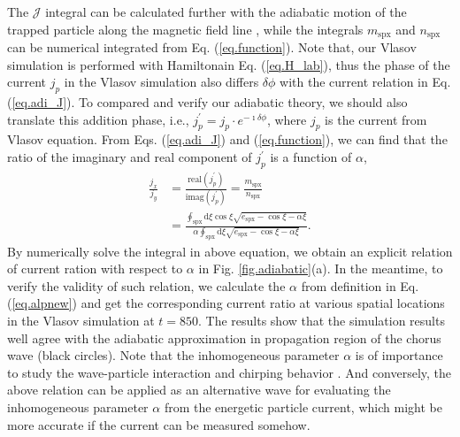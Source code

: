 The $\mathcal{J}$ integral can be calculated further with the adiabatic motion of the trapped particle along the magnetic field line \cite{summers2012}, while the integrals $m_\mathrm{spx}$ and $n_\mathrm{spx}$ can be numerical integrated from Eq. (\ref{eq.function}).
Note that, our Vlasov simulation is performed with Hamiltonain Eq. (\ref{eq.H_lab}), thus the phase of the current $j_p$ in the Vlasov simulation also differs $\delta \phi$ with the current relation in Eq. (\ref{eq.adi_J}).
To compared and verify our adiabatic theory, we should also translate this addition phase, i.e., $j^\prime_{p} = j_p \cdot e^{-\imath \delta \phi}$, where $j_p$ is the current from Vlasov equation. 
From Eqs. (\ref{eq.adi_J}) and (\ref{eq.function}), we can find that the ratio of the imaginary and real component of $j^\prime_{p}$ is a function of $\alpha$, 
\begin{equation}\label{eq.adia_relation}
    \begin{aligned}
\frac{j_x}{j_y} &= \frac{\mathrm{real}(j^\prime_p)}{\mathrm{imag}(j^\prime_p)} = \frac{m_\mathrm{spx}}{n_\mathrm{spx}}
\\
& = \frac{\oint_\mathrm{s p x} \mathrm{d} \xi \cos \xi \sqrt{e_\mathrm{s p x}-\cos \xi-\alpha \xi}}{\alpha \oint_\mathrm{s p x} \mathrm{d} \xi \sqrt{e_\mathrm{s p x}-\cos \xi-\alpha \xi}}.
            \end{aligned}
\end{equation}
By numerically solve the integral in above equation, we obtain an explicit relation of current ration with respect to $\alpha$ in Fig. \ref{fig.adiabatic}(a). 
In the meantime, to verify the validity of such relation, we calculate the $\alpha$ from definition in Eq. (\ref{eq.alpnew}) and get the corresponding current ratio at various spatial locations in the Vlasov simulation \cite{zheng2023b,zheng2024} at $t=850$.
The results show that the simulation results well agree with the adiabatic approximation in propagation region of the chorus wave (black circles).
Note that the inhomogeneous parameter $\alpha$ is of importance to study the wave-particle interaction and chirping behavior \cite{tao_theoretical_2020,omura2008}.
And conversely, the above relation can be applied as an alternative wave for evaluating the inhomogeneous parameter $\alpha$ from the energetic particle current, which might be more accurate if the current can be measured somehow.

